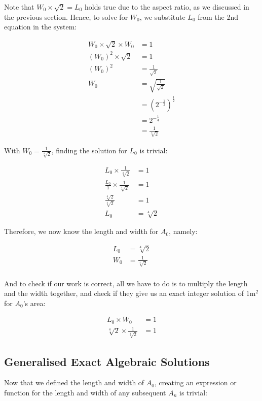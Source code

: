 \noindent
Note that $W_0 \times \sqrt{2} = L_0$ holds true due to the aspect ratio, as we discussed in the previous section. Hence, to solve for $W_0$, we substitute $L_0$ from the 2nd equation in the system:

\begin{align*}
  W_0 \times \sqrt{2} \times W_0 &= 1 \\
  \left(W_0\right)^2 \times \sqrt{2} &=1 \\
  \left(W_0\right)^2 &= \frac{1}{\sqrt{2}} \\
  W_0 &= \sqrt{\frac{1}{\sqrt{2}}} \\
  &= \left(2^{-\frac{1}{2}}\right)^{\frac{1}{2}} \\
  &= 2^{-\frac{1}{4}} \\
  &= \frac{1}{\sqrt[4]{2}}
\end{align*}

\noindent
With $W_0 = \frac{1}{\sqrt[4]{2}}$, finding the solution for $L_0$ is trivial:

\begin{align*}
  L_0 \times \frac{1}{\sqrt[4]{2}} &= 1 \\
  \frac{L_0}{1} \times \frac{1}{\sqrt[4]{2}} &= 1 \\
  \frac{\sqrt[4]{2}}{\sqrt[4]{2}} &= 1 \\
  L_0 &= \sqrt[4]{2}
\end{align*}

\noindent
Therefore, we now know the length and width for $A_0$, namely:

\begin{align*}
  L_0 &= \sqrt[4]{2} \\
  W_0 &= \frac{1}{\sqrt[4]{2}} \\
\end{align*}

\noindent
And to check if our work is correct, all we have to do is to multiply the length and the width together, and check if they give us an exact integer solution of $1\si{\meter\squared}$ for $A_0$'s area:

\begin{align*}
  L_0 \times W_0 &= 1 \\
  \sqrt[4]{2} \times \frac{1}{\sqrt[4]{2}} &= 1
\end{align*}

\subsection*{Generalised Exact Algebraic Solutions}
Now that we defined the length and width of $A_0$, creating an expression or function for the length and width of any subsequent $A_n$ is trivial:

